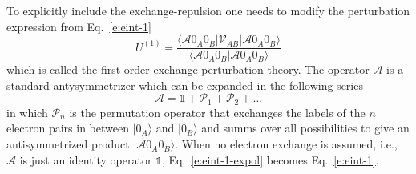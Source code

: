 \documentclass[a4paper,titlepage,twoside,fleqn,12pt]{book}
\begin{document}
\begin{refsection}
To explicitly include the exchange\hyp{}repulsion one needs to
modify the perturbation expression from Eq.~\eqref{e:eint-1}
%
\begin{equation} \label{e:eint-1-expol}
U^{(1)} = 
\frac{
\langle \mathscr{A} 0_A0_B \lvert \mathscr{V}_{AB} \rvert \mathscr{A} 0_A0_B \rangle 
}{
\langle \mathscr{A} 0_A0_B \vert \mathscr{A} 0_A0_B \rangle 
}
\end{equation}
%
which is called the first\hyp{}order exchange perturbation theory.
The operator $\mathscr{A}$ is a standard antysymmetrizer which
can be expanded in the following series
%
\begin{equation} \label{e:antisymmetrizer-series}
 \mathscr{A} = \mathbb{1} + \mathscr{P}_1 + \mathscr{P}_2 + \ldots
\end{equation}
%
in which $\mathscr{P}_n$ is the permutation operator that exchanges the labels 
of the $n$ electron pairs in between $\vert 0_A \rangle$ and $\vert 0_B \rangle$
and summs over all possibilities to give an antisymmetrized product
$\vert \mathscr{A} 0_A0_B \rangle $. When no electron exchange is
assumed, i.e., $\mathscr{A}$ is just an identity operator $\mathbb{1}$, 
Eq.~\eqref{e:eint-1-expol} becomes Eq.~\eqref{e:eint-1}.


\end{refsection}
\end{document}
